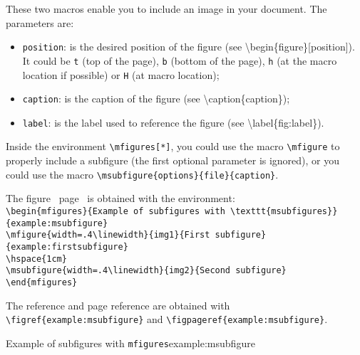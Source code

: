 \documentclass[book,taskpackage,specpackage,codepackage]{upmethodology-document}
\begin{document}
These two macros enable you to include an image in your document. The parameters are:
\begin{itemize}
\item \texttt{position}: is the desired position of the figure (see {\textbackslash}begin\{figure\}[position]). It could be \texttt{t} (top of the page), \texttt{b} (bottom of the page), \texttt{h} (at the macro location if possible) or \texttt{H} (at macro location);

\item \texttt{caption}: is the caption of the figure (see {\textbackslash}caption\{caption\});

\item \texttt{label}: is the label used to reference the figure (see {\textbackslash}label\{fig:label\}).
\end{itemize}

Inside the environment \texttt{{\textbackslash}mfigures[*]}, you could use the macro \texttt{{\textbackslash}mfigure} to properly include a subfigure (the first optional parameter is ignored), or you could use the macro \texttt{{\textbackslash}msubfigure\{options\}\{file\}\{caption\}}.

The figure~ page~ is obtained with the environment:\\
\texttt{{\textbackslash}begin\{mfigures\}\{Example of subfigures with {\textbackslash}texttt\{msubfigures\}\}\{example:msubfigure\}}\\
\texttt{{\textbackslash}mfigure\{width=.4{\textbackslash}linewidth\}\{img1\}\{First subfigure\}\{example:firstsubfigure\}} \\
\texttt{{\textbackslash}hspace\{1cm\}} \\
\texttt{{\textbackslash}msubfigure\{width=.4{\textbackslash}linewidth\}\{img2\}\{Second subfigure\}} \\
\texttt{{\textbackslash}end\{mfigures\}}

The reference and page reference are obtained with \texttt{{\textbackslash}figref\{example:msubfigure\}} and \texttt{{\textbackslash}figpageref\{example:msubfigure\}}.

\begin{mfigures}{Example of subfigures with \texttt{mfigures}}{example:msubfigure}
	\hspace{1cm}
\end{mfigures}
\end{document}
